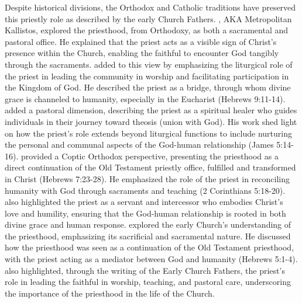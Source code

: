 \documentclass[12pt, doc]{apa7}   	%
\begin{document}
Despite historical divisions, the Orthodox and Catholic traditions have preserved this priestly role as described by the early Church Fathers.  \citet{orthodox_church_ware}, AKA Metropolitan Kallistos, explored the priesthood, from Orthodoxy, as both a sacramental and pastoral office. He explained that the priest acts as a visible sign of Christ’s presence within the Church, enabling the faithful to encounter God tangibly through the sacraments. \citet{eucharist_schmemann} added to this view by emphasizing the liturgical role of the priest in leading the community in worship and facilitating participation in the Kingdom of God. He described the priest as a bridge, through whom divine grace is channeled to humanity, especially in the Eucharist (Hebrews 9:11-14). \citet{priests_zacharias} added a pastoral dimension, describing the priest as a spiritual healer who guides individuals in their journey toward theosis (union with God). His work shed light on how the priest’s role extends beyond liturgical functions to include nurturing the personal and communal aspects of the God-human relationship (James 5:14-16).  \cite{priesthood_shenouda} provided a Coptic Orthodox perspective, presenting the priesthood as a direct continuation of the Old Testament priestly office, fulfilled and transformed in Christ (Hebrews 7:23-28). He emphasized the role of the priest in reconciling humanity with God through sacraments and teaching (2 Corinthians 5:18-20). \citeauthor{priesthood_shenouda} also highlighted the priest as a servant and intercessor who embodies Christ’s love and humility, ensuring that the God-human relationship is rooted in both divine grace and human response.  \citet{early_church_akin} explored the early Church’s understanding of the priesthood, emphasizing its sacrificial and sacramental nature. He discussed how the priesthood was seen as a continuation of the Old Testament priesthood, with the priest acting as a mediator between God and humanity (Hebrews 5:1-4). \citeauthor{early_church_akin} also highlighted, through the writing of the Early Church Fathers, the priest’s role in leading the faithful in worship, teaching, and pastoral care, underscoring the importance of the priesthood in the life of the Church.
\end{document}
